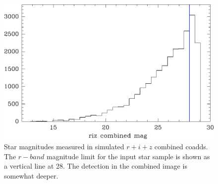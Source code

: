 \documentclass[iop, twocolappendix, appendixfloats, numberedappendix, apj]{hackemulateapj}
\begin{document}
\begin{figure}
    \includegraphics[width=\columnwidth]{mag-hist.pdf}
    \caption{
        Star magnitudes measured in simulated $r+i+z$ combined coadds.  The
        $r-band$ magnitude limit for the input star sample is shown as a
        vertical line at 28.  The detection in the combined image is
        somewhat deeper.
    }
\end{figure}
\end{document}
